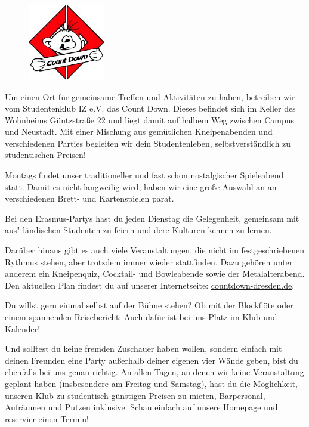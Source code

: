

\begin{figure}
  \vspace{-15pt}
  \begin{centering}
    \includegraphics[width=0.3\textwidth]{img/countdown.jpg}
  \end{centering}
  \vspace{-20pt}
\end{figure}

Um einen Ort für gemeinsame Treffen und Aktivitäten zu haben, betreiben wir vom Studentenklub IZ e.V. das Count Down.
Dieses befindet sich im Keller des Wohnheims Güntzstraße 22 und liegt damit auf halbem Weg zwischen Campus und Neustadt.
Mit einer Mischung aus gemütlichen Kneipenabenden und verschiedenen Parties begleiten wir dein Studentenleben, selbstverständlich zu studentischen Preisen!

Montags findet unser traditioneller und fast schon nostalgischer Spieleabend statt.
Damit es nicht langweilig wird, haben wir eine große Auswahl an an verschiedenen Brett- und Kartenspielen parat.

Bei den Erasmus-Partys hast du jeden Dienstag die Gelegenheit, gemeinsam mit aus"-ländischen Studenten zu feiern und dere Kulturen kennen zu lernen.

Darüber hinaus gibt es auch viele Veranstaltungen, die nicht im festgeschriebenen Rythmus stehen, aber trotzdem immer wieder stattfinden.
Dazu gehören unter anderem ein Kneipenquiz, Cocktail- und Bowleabende sowie der Metalalterabend.
Den aktuellen Plan findest du auf unserer Internetseite: \url{countdown-dresden.de}.

Du willst gern einmal selbst auf der Bühne stehen?
Ob mit der Blockflöte oder einem spannenden Reisebericht:
Auch dafür ist bei uns Platz im Klub und Kalender!

Und solltest du keine fremden Zuschauer haben wollen, sondern einfach mit deinen Freunden eine Party außerhalb deiner eigenen vier Wände geben, bist du ebenfalls bei uns genau richtig.
An allen Tagen, an denen wir keine Veranstaltung geplant haben (insbesondere am Freitag und Samstag), hast du die Möglichkeit, unseren Klub zu studentisch günstigen Preisen zu mieten, Barpersonal, Aufräumen und Putzen inklusive.
Schau einfach auf unsere Homepage und reservier einen Termin!

